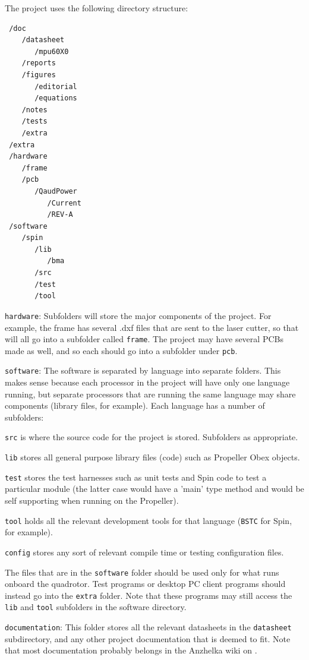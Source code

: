 \documentclass{article}
\numberwithin{equation}{section} %
\begin{document}
The project uses the following directory structure:
\begin{lstlisting}
 /doc 
    /datasheet 
       /mpu60X0
    /reports 
    /figures 
       /editorial 
       /equations 
    /notes 
    /tests 
    /extra 
 /extra 
 /hardware 
    /frame 
    /pcb 
       /QaudPower
          /Current
          /REV-A
 /software 
    /spin 
       /lib 
          /bma
       /src 
       /test 
       /tool
\end{lstlisting} 
 
 
\texttt{hardware}:
Subfolders will store the major components of the project. For example, the frame has several .dxf files that are sent to the laser cutter, so that will all go into a subfolder called \texttt{frame}. The project may have several PCBs made as well, and so each should go into a subfolder under \texttt{pcb}. 

\texttt{software}:
The software is separated by language into separate folders. This makes sense because each processor in the project will have only one language running, but separate processors that are running the same language may share components (library files, for example). Each language has a number of subfolders: 

\begin{list}{*}{}
	\item \texttt{src} is where the source code for the project is stored. Subfolders as appropriate. 
	\item \texttt{lib} stores all general purpose library files (code) such as Propeller Obex objects. 
	\item \texttt{test} stores the test harnesses such as unit tests and Spin code to test a particular module (the latter case would have a 'main' type method and would be self supporting when running on the Propeller). 
	\item \texttt{tool} holds all the relevant development tools for that language (\texttt{BSTC} for Spin, for example). 
	\item \texttt{config} stores any sort of relevant compile time or testing configuration files. 
\end{list}
The files that are in the \texttt{software} folder should be used only for what runs onboard the quadrotor. Test programs or desktop PC client programs should instead go into the \texttt{extra} folder. Note that these programs may still access the \texttt{lib} and \texttt{tool} subfolders in the software directory. 

\texttt{documentation}:
This folder stores all the relevant datasheets in the \texttt{datasheet} subdirectory, and any other project documentation that is deemed to fit. Note that most documentation probably belongs in the Anzhelka wiki on \cite{anzhelka_code}. 
\end{document}
